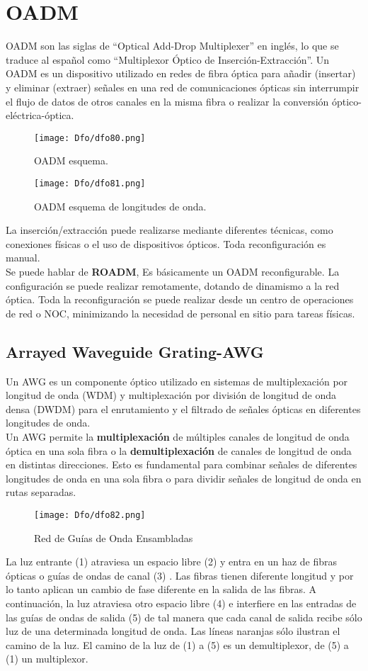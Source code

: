 \documentclass[
	12pt, %
	fleqn, %
	a4paper, %
	oneside, %
]{LegrandOrangeBook}
\begin{document}
\section{OADM}
OADM son las siglas de ``Optical Add-Drop Multiplexer'' en inglés, lo que se traduce al español como ``Multiplexor Óptico de Inserción-Extracción''. Un OADM es un dispositivo utilizado en redes de fibra óptica para añadir (insertar) y eliminar (extraer) señales en una red de comunicaciones ópticas sin interrumpir el flujo de datos de otros canales en la misma fibra o realizar la conversión óptico-eléctrica-óptica.
\begin{figure}[H]
\centering
\texttt{[image: Dfo/dfo80.png]}
\caption{OADM esquema.}
\end{figure}
\begin{figure}[H]
\centering
\texttt{[image: Dfo/dfo81.png]}
\caption{OADM esquema de longitudes de onda.}
\end{figure}
La inserción/extracción puede realizarse mediante diferentes técnicas, como conexiones físicas o el uso de dispositivos ópticos. Toda reconfiguración es manual.\\
Se puede hablar de \textbf{ROADM}, Es básicamente un OADM reconfigurable. La configuración se puede realizar remotamente, dotando de dinamismo a la red óptica. Toda la reconfiguración se puede realizar desde un centro de operaciones de red o NOC, minimizando la necesidad de personal en sitio para tareas físicas.
\subsection{Arrayed Waveguide Grating-AWG}
Un AWG es un componente óptico utilizado en sistemas de multiplexación por longitud de onda (WDM) y multiplexación por división de longitud de onda densa (DWDM) para el enrutamiento y el filtrado de señales ópticas en diferentes longitudes de onda.\\
Un AWG permite la \textbf{multiplexación} de múltiples canales de longitud de onda óptica en una sola fibra o la \textbf{demultiplexación} de canales de longitud de onda en distintas direcciones. Esto es fundamental para combinar señales de diferentes longitudes de onda en una sola fibra o para dividir señales de longitud de onda en rutas separadas.
\begin{figure}[H]
\centering
\texttt{[image: Dfo/dfo82.png]}
\caption{Red de Guías de Onda Ensambladas}
\end{figure}
La luz entrante (1) atraviesa un espacio libre (2) y entra en un haz de fibras ópticas o guías de ondas de canal (3) . Las fibras tienen diferente longitud y por lo tanto aplican un cambio de fase diferente en la salida de las fibras. A continuación, la luz atraviesa otro espacio libre (4) e interfiere en las entradas de las guías de ondas de salida (5) de tal manera que cada canal de salida recibe sólo luz de una determinada longitud de onda. Las líneas naranjas sólo ilustran el camino de la luz. El camino de la luz de (1) a (5) es un demultiplexor, de (5) a (1) un multiplexor.
\end{document}
